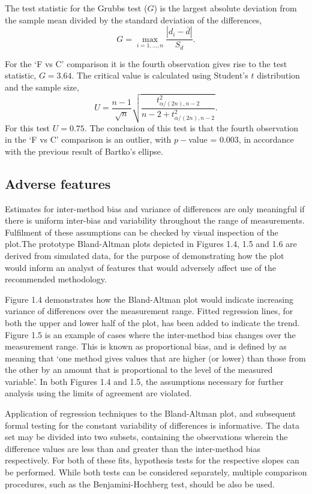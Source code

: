 \documentclass[Main.tex]{subfiles}
\begin{document}
	The test statistic for the Grubbs test ($G$) is the largest
	absolute deviation from the sample mean divided by the standard
	deviation of the differences,
	\[
	G =  \displaystyle\max_{i=1,\ldots, n}\frac{\left \vert d_i -
		\bar{d}\right\vert}{S_{d}}.
	\]
	
	For the `F vs C' comparison it is the fourth observation gives
	rise to the test statistic, $G = 3.64$. The critical value is
	calculated using Student's $t$ distribution and the sample size,
	\[
	U = \frac{n-1}{\sqrt{n}} \sqrt{\frac{t_{\alpha/(2n),n-2}^2}{n - 2
			+ t_{\alpha/(2n),n-2}^2}}.
	\]
	For this test $U = 0.75$. The conclusion of this test is that the fourth observation in the `F vs C' comparison is an outlier, with $p-$value = 0.003, in accordance with the previous result of Bartko's ellipse.
	
\newpage	

\subsection{Adverse features}

Estimates for inter-method bias and variance of differences are only meaningful if there is uniform inter-bias and variability throughout the range of measurements. Fulfilment of these assumptions can be checked by visual inspection of the plot.The prototype Bland-Altman plots depicted in Figures 1.4, 1.5 and 1.6 are derived from simulated data, for the purpose of demonstrating how the plot would inform an analyst of features that would adversely affect use of the recommended methodology.

Figure 1.4 demonstrates how the Bland-Altman plot would indicate increasing variance of differences over the measurement range.
Fitted regression lines, for both the upper and lower half of the plot, has been added to indicate the trend. Figure 1.5 is an
example of cases where the inter-method bias changes over the measurement range. This is known as proportional bias, and is defined by \citet{ludbrook97} as meaning that `one method gives values that are higher (or lower) than those from the other by an
amount that is proportional to the level of the measured
variable'. In both Figures 1.4 and 1.5, the assumptions necessary
for further analysis using the limits of agreement are violated.

Application of regression techniques to the Bland-Altman plot, and subsequent formal testing for the constant variability of
differences is informative. The data set may be divided into two subsets, containing the observations wherein the difference values
are less than and greater than the inter-method bias respectively. For both of these fits, hypothesis tests for the respective slopes
can be performed. While both tests can be considered separately, multiple comparison procedures, such as the Benjamini-Hochberg
\citep{BH} test, should be also be used.
\end{document}
